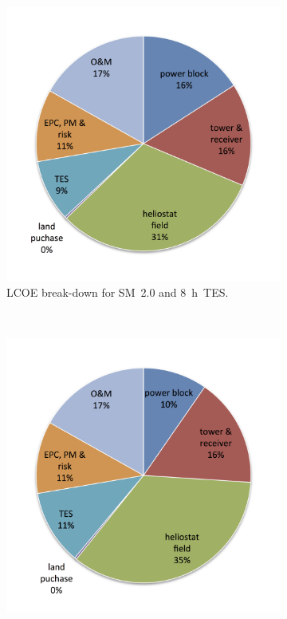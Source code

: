 \begin{figure}[!htbp]
        \centering                
        \begin{subfigure}[b]{0.5\textwidth}
                \centering
                \includegraphics[width=1\textwidth]{FIG/CR_LCOE_lowinvest_BreakDown}
                \caption{LCOE break-down for SM~2.0 and 8~h~TES.}\label{CR_LCOE_lowinvest_BreakDown}
        \end{subfigure}%
        ~
        \begin{subfigure}[b]{0.5\textwidth}
                \centering
                \includegraphics[width=1\textwidth]{FIG/CR_LCOE_highinvest_BreakDown}

\end{subfigure}
\end{figure}
